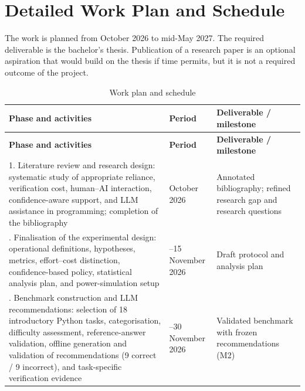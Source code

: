 \documentclass[oneside,final,14pt,a4paper]{extreport}
\begin{document}
\section{Detailed Work Plan and Schedule}
\label{sec:workplan}


The work is planned from October 2026 to mid-May 2027. The required
deliverable is the bachelor's thesis. Publication of a research paper is an
optional aspiration that would build on the thesis if time permits, but it is
not a required outcome of the project.


\small
\begin{longtable}{>{\raggedright\arraybackslash}p{7.4cm}>{\raggedright\arraybackslash}p{2.0cm}>{\raggedright\arraybackslash}p{5.2cm}}
\caption{Work plan and schedule}
\label{tab:workplan} \\
\toprule
\textbf{Phase and activities} & \textbf{Period} &
\textbf{Deliverable / milestone} \\
\midrule
\endfirsthead


\toprule
\textbf{Phase and activities} & \textbf{Period} &
\textbf{Deliverable / milestone} \\
\midrule
\endhead


\bottomrule
\endfoot


1. Literature review and research design:
systematic study of appropriate reliance, verification cost, human--AI
interaction, confidence-aware support, and LLM assistance in programming;
completion of the bibliography &
October 2026 &
Annotated bibliography; refined research gap and research questions \\


2. Finalisation of the experimental design:
operational definitions, hypotheses, metrics, effort--cost distinction,
confidence-based policy, statistical analysis plan, and power-simulation
setup &
1--15 November 2026 &
Draft protocol and analysis plan \\


3. Benchmark construction and LLM recommendations:
selection of 18 introductory Python tasks, categorisation, difficulty
assessment, reference-answer validation, offline generation and validation of
recommendations (9 correct / 9 incorrect), and task-specific verification
evidence &
1--30 November 2026 &
Validated benchmark with frozen recommendations (M2) \\



\end{longtable}
\end{document}
